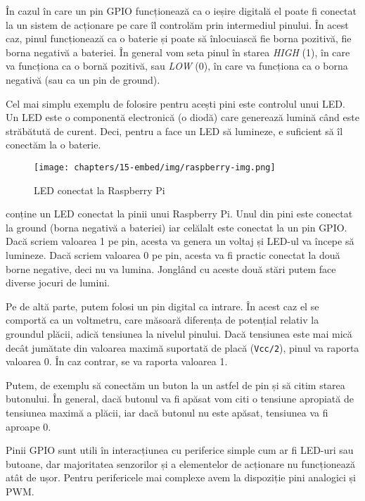 În cazul în care un pin GPIO funcționează ca o ieșire digitală el poate fi
conectat la un sistem de acționare pe care îl controlăm prin intermediul
pinului. În acest caz, pinul funcționează ca o baterie și poate să înlocuiască
fie borna pozitivă, fie borna negativă a bateriei. În general vom seta pinul în
starea \textit{HIGH} (1), în care va funcționa ca o bornă pozitivă, sau \textit{LOW} (0), în care
va funcționa ca o borna negativă (sau ca un pin de ground).

Cel mai simplu exemplu de folosire pentru acești pini este controlul unui LED.
Un LED este o componentă electronică (o diodă) care generează lumină când este
străbătută de curent. Deci, pentru a face un LED să lumineze, e suficient să îl
conectăm la o baterie.

\begin{figure}[!htbp]
	\centering
	\texttt{[image: chapters/15-embed/img/raspberry-img.png]}
        \caption{LED conectat la Raspberry Pi}
	\label{fig:embed:raspberry}
\end{figure}

 conține un LED conectat la pinii
unui Raspberry Pi. Unul din pini este conectat la ground (borna negativă a
bateriei) iar celălalt este conectat la un pin GPIO. Dacă scriem valoarea 1 pe
pin, acesta va genera un voltaj și LED-ul va începe să lumineze. Dacă scriem
valoarea 0 pe pin, acesta va fi practic conectat la două borne negative, deci nu
va lumina. Jonglând cu aceste două stări putem face diverse jocuri de lumini.

Pe de altă parte, putem folosi un pin digital ca intrare. În acest caz el se
comportă ca un voltmetru, care măsoară diferența de potențial relativ la
groundul plăcii, adică tensiunea la nivelul pinului. Dacă tensiunea este mai
mică decât jumătate din valoarea maximă suportată de placă (\texttt{Vcc/2}), pinul va
raporta valoarea 0. În caz contrar, se va raporta valoarea 1.

Putem, de exemplu să conectăm un buton la un astfel de pin și să citim starea
butonului. În general, dacă butonul va fi apăsat vom citi o tensiune apropiată
de tensiunea maximă a plăcii, iar dacă butonul nu este apăsat, tensiunea va fi
aproape 0.

Pinii GPIO sunt utili în interacțiunea cu periferice simple cum ar fi LED-uri
sau butoane, dar majoritatea senzorilor și a elementelor de acționare nu
funcționează atât de ușor. Pentru perifericele mai complexe avem la dispoziție
pini analogici și PWM.

